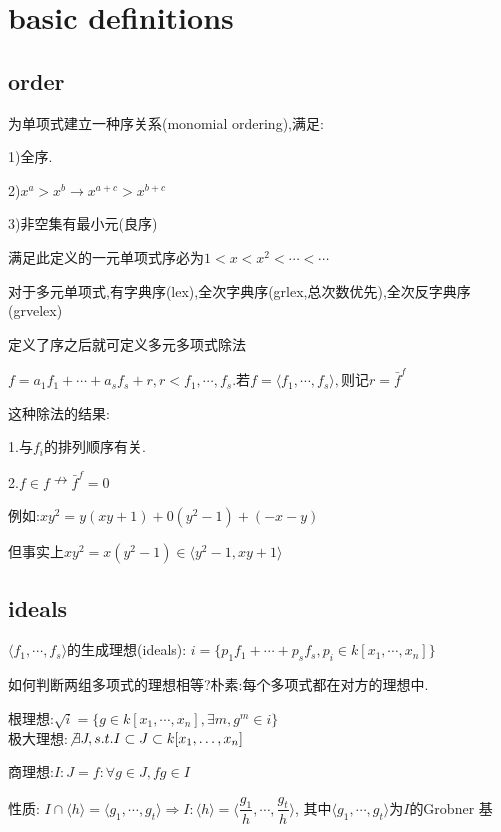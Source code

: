 
\section{basic definitions}
\subsection{order}
为单项式建立一种序关系(monomial ordering),满足:

1)全序.

2)$ x^a>x^b\rightarrow x^{a+c}>x^{b+c}$

3)非空集有最小元(良序)

满足此定义的一元单项式序必为$ 1<x<x^2<\cdots<\cdots$

对于多元单项式,有字典序(lex),全次字典序(grlex,总次数优先),全次反字典序(grvelex)

定义了序之后就可定义多元多项式除法

$ f=a_1f_1+\cdots+a_sf_s+r,r<f_1,\cdots,f_s$.若$ f=\langle f_1,\cdots,f_s \rangle,$则记$ r=\bar{f}^{f}$

这种除法的结果:

1.与$ f_i$的排列顺序有关.

2.$ f\in f \nrightarrow \bar{f}^f=0$

例如:$ xy^2=y(xy+1)+0(y^2-1)+(-x-y)$

但事实上$ xy^2=x(y^2-1)\in \langle y^2-1,xy+1 \rangle$


\subsection{ideals}
$ \langle f_1,\cdots,f_s \rangle$的生成理想(ideals): 
$ i=\{p_1f_1+\cdots+p_sf_s,p_i\in k[x_1,\cdots,x_n]\}$

如何判断两组多项式的理想相等?朴素:每个多项式都在对方的理想中.

根理想:$ \sqrt{i}=\{g\in k[x_1,\cdots,x_n],\exists m,g^m\in i \}$
\\

极大理想:$ \not \exists J,s.t. I \subset J \subset k[x_1,\ldots,x_n]$ 

商理想:$ I:J={f: \forall g \in J,fg\in I }$

性质: $ I\cap \langle h \rangle =\langle g_1,\cdots,g_t \rangle\Rightarrow I:\langle h \rangle=\langle \dfrac{g_1}{h},\cdots,\dfrac{g_t}{h} \rangle$,
其中$ \langle g_1,\cdots,g_t \rangle $为$ I$的Grobner 基
\\


